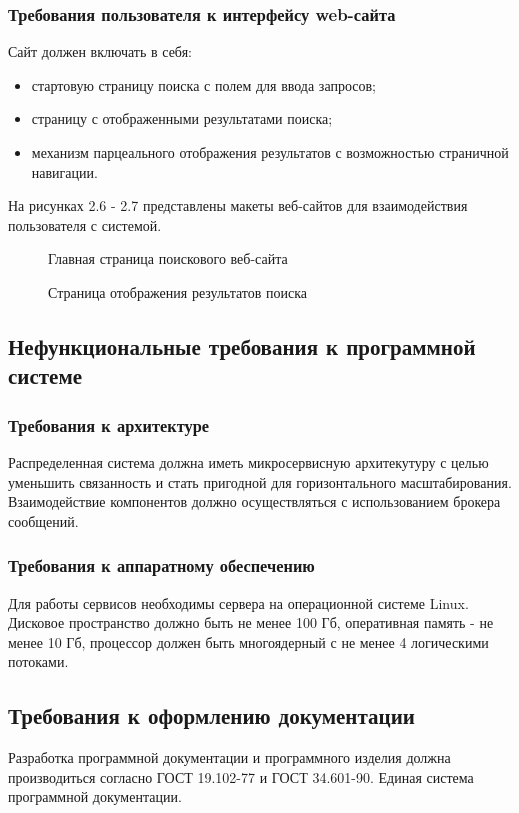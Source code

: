 \subsubsection{Требования пользователя к интерфейсу web-сайта}

Сайт должен включать в себя:
\begin{itemize}
	\item стартовую страницу поиска с полем для ввода запросов;
	\item страницу с отображенными результатами поиска;
	\item механизм парцеального отображения результатов с возможностью страничной навигации.
\end{itemize}

На рисунках 2.6 - 2.7 представлены макеты веб-сайтов для взаимодействия пользователя с системой.
\begin{figure}[H]
\caption{Главная страница поискового веб-сайта}
\label{site_main:image}
\end{figure}
\begin{figure}[H]
\caption{Страница отображения результатов поиска}
\label{site_search:image}
\end{figure}

\subsection{Нефункциональные требования к программной системе}

\subsubsection{Требования к архитектуре}

Распределенная система должна иметь микросервисную архитекутуру с целью уменьшить связанность и стать пригодной для горизонтального масштабирования. Взаимодействие компонентов должно осуществляться с использованием брокера сообщений.

\subsubsection{Требования к аппаратному обеспечению}

Для работы сервисов необходимы сервера на операционной системе Linux. Дисковое пространство должно быть не менее 100 Гб, оперативная память  - не менее 10 Гб, процессор должен быть многоядерный с не менее 4 логическими потоками.

\subsection{Требования к оформлению документации}

Разработка программной документации и программного изделия должна производиться согласно ГОСТ 19.102-77 и ГОСТ 34.601-90. Единая система программной документации.
